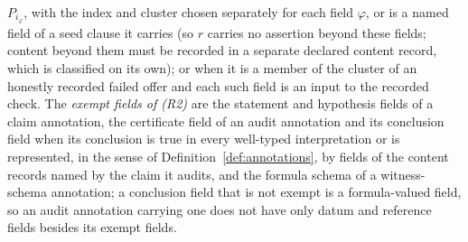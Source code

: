 \(P_{i_\varphi}\), with the index and cluster chosen separately for each field
\(\varphi\), or is a named field of a seed clause it carries (so \(r\) carries no assertion beyond these fields; content beyond them must be recorded in a separate declared content record, which is classified on its own); or when it is a member of the cluster of an honestly
recorded failed offer and each such field is an input to the recorded check.
The \emph{exempt fields of (R2)} are the statement and hypothesis fields of a
claim annotation, the certificate field of an audit annotation and its conclusion field when its conclusion is true in every well-typed interpretation or is represented, in the sense of Definition~\ref{def:annotations}, by fields of the content records named by the claim it audits,
and the formula schema of a witness-schema annotation; a conclusion field that is not exempt is a formula-valued field, so an audit annotation carrying one does not have only datum and reference fields besides its exempt fields.

